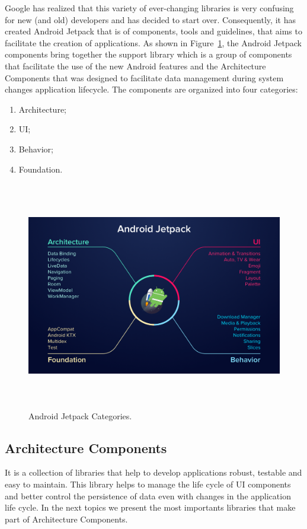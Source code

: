 \documentclass[a4paper, 12pt]{article}
\begin{document}
Google has realized that this variety of ever-changing libraries is very confusing for new (and old) developers and has decided to start over. 
Consequently, it has created Android Jetpack that is of components, tools and guidelines, that aims to facilitate the creation of applications.
As shown in Figure~\ref{fig:jetpackCategories}, the Android Jetpack components bring together
the support library which is a group of components that facilitate the use
of the new Android features and the Architecture Components that was
designed to facilitate data management during system changes
application lifecycle. The components are organized into four
categories:

\begin{enumerate}
	\item Architecture;
	\item UI;
	\item Behavior;
	\item Foundation.
\end{enumerate}


\begin{figure}[h]
	\centering
	\includegraphics[height=10cm]{imgs/jetpack.png}
	\caption{Android Jetpack Categories.}
	\label{fig:jetpackCategories}
\end{figure}

\subsection{Architecture Components}

It is a collection of libraries that help to develop applications
robust, testable and easy to maintain. This library helps to manage the
life cycle of UI components and better control the persistence of
data even with changes in the application life cycle.
In the next topics we present the most importants libraries that make
part of Architecture Components.
\end{document}

